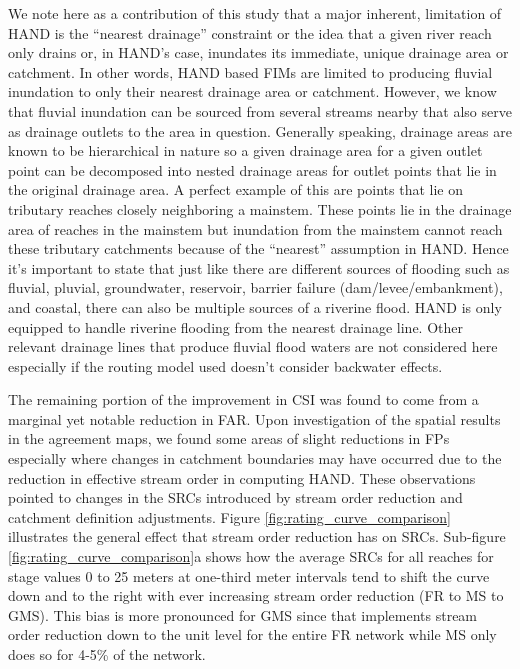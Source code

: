 \documentclass[draft]{dependencies/agujournal2019}
\begin{document}
We note here as a contribution of this study that a major inherent, limitation of HAND is the ``nearest drainage'' constraint or the idea that a given river reach only drains or, in HAND's case, inundates its immediate, unique drainage area or catchment.
In other words, HAND based FIMs are limited to producing fluvial inundation to only their nearest drainage area or catchment.
However, we know that fluvial inundation can be sourced from several streams nearby that also serve as drainage outlets to the area in question.
Generally speaking, drainage areas are known to be hierarchical in nature so a given drainage area for a given outlet point can be decomposed into nested drainage areas for outlet points that lie in the original drainage area.
A perfect example of this are points that lie on tributary reaches closely neighboring a mainstem.
These points lie in the drainage area of reaches in the mainstem but inundation from the mainstem cannot reach these tributary catchments because of the ``nearest'' assumption in HAND.
Hence it's important to state that just like there are different sources of flooding such as fluvial, pluvial, groundwater, reservoir, barrier failure (dam/levee/embankment), and coastal, there can also be multiple sources of a riverine flood.
HAND is only equipped to handle riverine flooding from the nearest drainage line.
Other relevant drainage lines that produce fluvial flood waters are not considered here especially if the routing model used doesn't consider backwater effects.

The remaining portion of the improvement in CSI was found to come from a marginal yet notable reduction in FAR.
Upon investigation of the spatial results in the agreement maps, we found some areas of slight reductions in FPs especially where changes in catchment boundaries may have occurred due to the reduction in effective stream order in computing HAND.
These observations pointed to changes in the SRCs introduced by stream order reduction and catchment definition adjustments.
Figure \ref{fig:rating_curve_comparison} illustrates the general effect that stream order reduction has on SRCs.
Sub-figure \ref{fig:rating_curve_comparison}a shows how the average SRCs for all reaches for stage values 0 to 25 meters at one-third meter intervals tend to shift the curve down and to the right with ever increasing stream order reduction (FR to MS to GMS). 
This bias is more pronounced for GMS since that implements stream order reduction down to the unit level for the entire FR network while MS only does so for 4-5\% of the network.
\end{document}
